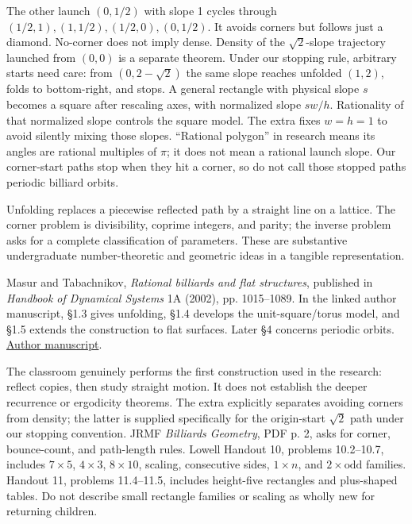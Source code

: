 \documentclass[11pt]{article}
\begin{document}
The other launch $(0,1/2)$ with slope 1 cycles through $(1/2,1),(1,1/2),(1/2,0),(0,1/2)$. It avoids corners but follows just a diamond. No-corner does not imply dense. Density of the $\sqrt2$-slope trajectory launched from $(0,0)$ is a separate theorem. Under our stopping rule, arbitrary starts need care: from $(0,2-\sqrt2)$ the same slope reaches unfolded $(1,2)$, folds to bottom-right, and stops.
A general rectangle with physical slope $s$ becomes a square after rescaling axes, with normalized slope $sw/h$. Rationality of that normalized slope controls the square model. The extra fixes $w=h=1$ to avoid silently mixing those slopes. ``Rational polygon'' in research means its angles are rational multiples of $\pi$; it does not mean a rational launch slope. Our corner-start paths stop when they hit a corner, so do not call those stopped paths periodic billiard orbits.

\newpage

Unfolding replaces a piecewise reflected path by a straight line on a lattice. The corner problem is divisibility, coprime integers, and parity; the inverse problem asks for a complete classification of parameters. These are substantive undergraduate number-theoretic and geometric ideas in a tangible representation.

Masur and Tabachnikov, \emph{Rational billiards and flat structures}, published in \emph{Handbook of Dynamical Systems} 1A (2002), pp. 1015--1089. In the linked author manuscript, \S1.3 gives unfolding, \S1.4 develops the unit-square/torus model, and \S1.5 extends the construction to flat surfaces. Later \S4 concerns periodic orbits. \href{https://math.uchicago.edu/~masur/handbook1.pdf}{Author manuscript}.

The classroom genuinely performs the first construction used in the research: reflect copies, then study straight motion. It does not establish the deeper recurrence or ergodicity theorems. The extra explicitly separates avoiding corners from density; the latter is supplied specifically for the origin-start $\sqrt2$ path under our stopping convention.
JRMF \emph{Billiards Geometry}, PDF p. 2, asks for corner, bounce-count, and path-length rules. Lowell Handout 10, problems 10.2--10.7, includes $7\times5$, $4\times3$, $8\times10$, scaling, consecutive sides, $1\times n$, and $2\times\text{odd}$ families. Handout 11, problems 11.4--11.5, includes height-five rectangles and plus-shaped tables. Do not describe small rectangle families or scaling as wholly new for returning children.
\end{document}
